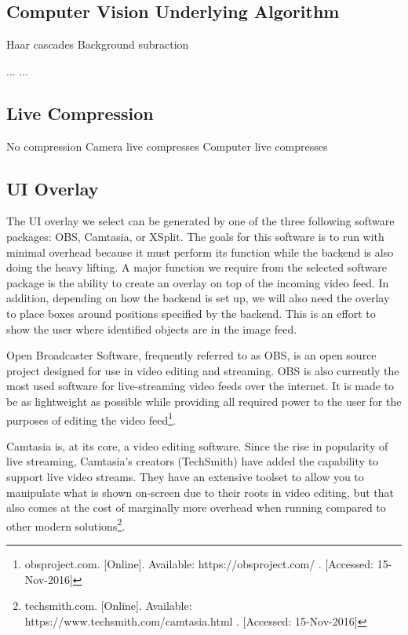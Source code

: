 \documentclass[letterpaper,10pt,onecolumn,draftclsnofoot]{IEEEtran}
\begin{document}
\newpage
\subsection{Computer Vision Underlying Algorithm} %

Haar cascades
Background subraction

...
...

\newpage
\subsection{Live Compression} %

No compression
Camera live compresses
Computer live compresses

\newpage
\subsection{UI Overlay} %

The UI overlay we select can be generated by one of the three following software packages:  OBS, Camtasia, or XSplit.  The goals for this software is to run with minimal overhead because it must perform its function while the backend is also doing the heavy lifting.  A major function we require from the selected software package is the ability to create an overlay on top of the incoming video feed.  In addition, depending on how the backend is set up, we will also need the overlay to place boxes around positions specified by the backend.  This is an effort to show the user where identified objects are in the image feed.

Open Broadcaster Software, frequently referred to as OBS, is an open source project designed for use in video editing and streaming.  OBS is also currently the most used software for live-streaming video feeds over the internet.  It is made to be as lightweight as possible while providing all required power to the user for the purposes of editing the video feed\footnote{obsproject.com. [Online]. Available: https://obsproject.com/ . [Accessed: 15-Nov-2016] }.

Camtasia is, at its core, a video editing software.  Since the rise in popularity of live streaming, Camtasia's creators (TechSmith) have added the capability to support live video streams.  They have an extensive toolset to allow you to manipulate what is shown on-screen due to their roots in video editing, but that also comes at the cost of marginally more overhead when running compared to other modern solutions\footnote{techsmith.com. [Online]. Available: https://www.techsmith.com/camtasia.html . [Accessed: 15-Nov-2016] }.
\end{document}
